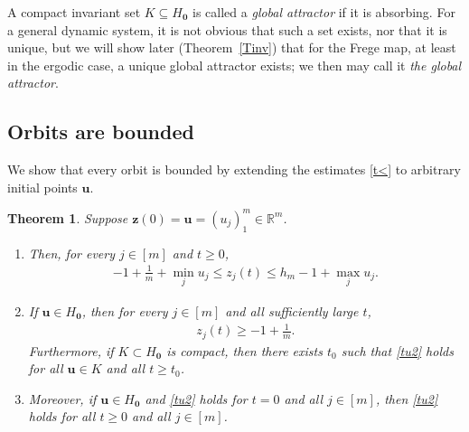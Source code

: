 \documentclass[11pt,reqno,tbtags,a4paper]{amsart}
\numberwithin{equation}{section}
\renewcommand\le{\leq}
\renewcommand\ge{\geq}
\renewcommand\leq{\leqslant}
\renewcommand\geq{\geqslant}
\theoremstyle{plain}%
\newtheorem{theorem}{Theorem}[section]
\theoremstyle{definition}
\theoremstyle{remark}
\newenvironment{romenumerate}[1][-10pt]{%
\addtolength{\leftmargini}{#1}\begin{enumerate}%
 \renewcommand{\labelenumi}{\textup{(\roman{enumi})}}%
 \renewcommand{\theenumi}{\labelenumi}%
%
 }{\end{enumerate}}
\newcommand{\refT}[1]{Theorem~\ref{#1}}
\newcommand\bbR{\mathbb R}
\newcommand\Ho{H_{\0}}
\newcommand\vu{\mathbf{u}}
\newcommand\vz{\mathbf{z}}
\newcommand\0{{\boldsymbol 0}}
\newcommand\1{{\boldsymbol 1}}
\begin{document}
A compact invariant set $K\subseteq\Ho$ is called a \emph{global attractor}
if it is absorbing. 
For a general dynamic system, it is not obvious that such a set exists, nor
that it is  unique, but
we will show later (\refT{Tinv})
that for the Frege map,
at least in the ergodic case, 
a unique global attractor exists; we then may call it
\emph{the global attractor}. 


\subsection{Orbits are bounded}\label{Sorbit}

We  show that every orbit is bounded by extending the estimates
\eqref{t<} to arbitrary initial points $\vu$. 
\begin{theorem}\label{Tu}
Suppose $\vz(0)=\vu=(u_j)_1^m\in\bbR^m$.
\begin{romenumerate}
  
\item \label{Tu1}
Then,
  for every $j\in[m]$ and $t\ge0$,
  \begin{align}\label{tu1}
-1+\frac{1}{m} + \min_j u_j
\le    z_j(t) 
\le h_m-1 + \max_j u_j.
  \end{align}
\item \label{Tu2}
If $\vu\in\Ho$, then for every $j\in[m]$ and all sufficiently large $t$,
\begin{align}\label{tu2}
  z_j(t)\ge -1+\frac{1}{m}.
\end{align}
Furthermore, if $K\subset\Ho$ is compact, then there exists $t_0$ such that
\eqref{tu2} holds for all $\vu\in K$ and all $t\ge t_0$.
\item \label{Tu3}
Moreover, if $\vu\in\Ho$ and \eqref{tu2} holds for $t=0$ and all
$j\in[m]$,
then \eqref{tu2} holds for all $t\ge0$ and all $j\in[m]$.
\end{romenumerate}
\end{theorem}
\end{document}
